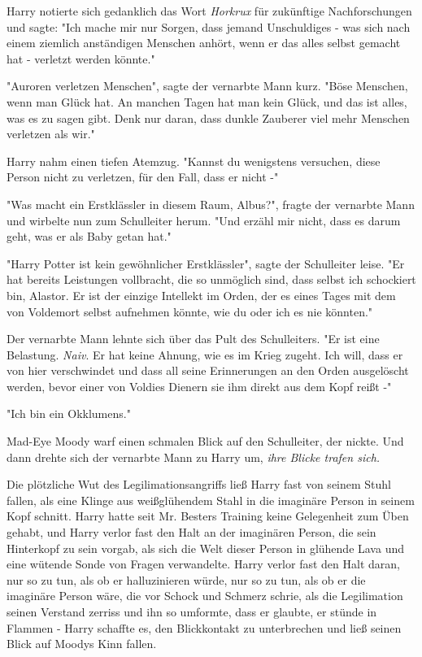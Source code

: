 {Harry notierte sich gedanklich das Wort \emph{Horkrux} für zukünftige Nachforschungen und sagte: "Ich mache mir nur Sorgen, dass jemand Unschuldiges - was sich nach einem ziemlich anständigen Menschen anhört, wenn er das alles selbst gemacht hat - verletzt werden könnte."

"Auroren verletzen Menschen", sagte der vernarbte Mann kurz. "Böse Menschen, wenn man Glück hat. An manchen Tagen hat man kein Glück, und das ist alles, was es zu sagen gibt. Denk nur daran, dass dunkle Zauberer viel mehr Menschen verletzen als wir."

Harry nahm einen tiefen Atemzug. "Kannst du wenigstens versuchen, diese Person nicht zu verletzen, für den Fall, dass er nicht -"

"Was macht ein Erstklässler in diesem Raum, Albus?", fragte der vernarbte Mann und wirbelte nun zum Schulleiter herum. "Und erzähl mir nicht, dass es darum geht, was er als Baby getan hat."

"Harry Potter ist kein gewöhnlicher Erstklässler", sagte der Schulleiter leise. "Er hat bereits Leistungen vollbracht, die so unmöglich sind, dass selbst ich schockiert bin, Alastor. Er ist der einzige Intellekt im Orden, der es eines Tages mit dem von Voldemort selbst aufnehmen könnte, wie du oder ich es nie könnten."

Der vernarbte Mann lehnte sich über das Pult des Schulleiters. "Er ist eine Belastung. \emph{Naiv}. Er hat keine Ahnung, wie es im Krieg zugeht. Ich will, dass er von hier verschwindet und dass all seine Erinnerungen an den Orden ausgelöscht werden, bevor einer von Voldies Dienern sie ihm direkt aus dem Kopf reißt -"

"Ich bin ein Okklumens."

Mad-Eye Moody warf einen schmalen Blick auf den Schulleiter, der nickte. Und dann drehte sich der vernarbte Mann zu Harry um, \emph{ihre Blicke trafen sich.}

Die plötzliche Wut des Legilimationsangriffs ließ Harry fast von seinem Stuhl fallen, als eine Klinge aus weißglühendem Stahl in die imaginäre Person in seinem Kopf schnitt. Harry hatte seit Mr. Besters Training keine Gelegenheit zum Üben gehabt, und Harry verlor fast den Halt an der imaginären Person, die sein Hinterkopf zu sein vorgab, als sich die Welt dieser Person in glühende Lava und eine wütende Sonde von Fragen verwandelte. Harry verlor fast den Halt daran, nur so zu tun, als ob er halluzinieren würde, nur so zu tun, als ob er die imaginäre Person wäre, die vor Schock und Schmerz schrie, als die Legilimation seinen Verstand zerriss und ihn so umformte, dass er glaubte, er stünde in Flammen - Harry schaffte es, den Blickkontakt zu unterbrechen und ließ seinen Blick auf Moodys Kinn fallen.

}
